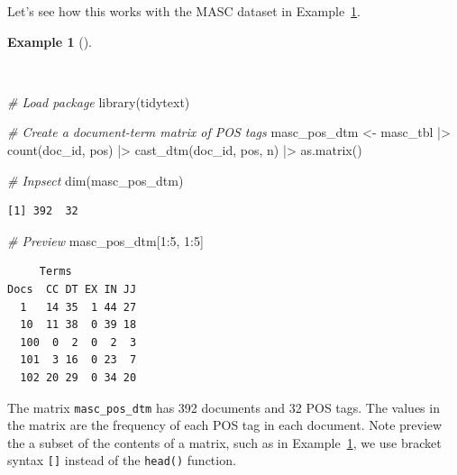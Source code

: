 \documentclass[
  letterpaper,
  krantz1]{latex/krantz-mod}
\newenvironment{Shaded}{\begin{snugshade}}{\end{snugshade}}
\newcommand{\CommentTok}[1]{\textcolor[rgb]{0.00,0.00,0.00}{\textit{#1}}}
\newcommand{\DecValTok}[1]{\textcolor[rgb]{0.00,0.00,0.00}{#1}}
\newcommand{\FunctionTok}[1]{\textcolor[rgb]{0.00,0.00,0.00}{#1}}
\newcommand{\NormalTok}[1]{\textcolor[rgb]{0.00,0.00,0.00}{#1}}
\newcommand{\OtherTok}[1]{\textcolor[rgb]{0.00,0.00,0.00}{#1}}
\newcommand{\SpecialCharTok}[1]{\textcolor[rgb]{0.00,0.00,0.00}{#1}}
\theoremstyle{definition}
\newtheorem{example}{Example}[chapter]
\theoremstyle{definition}
\theoremstyle{remark}
\begin{document}
Let's see how this works with the MASC dataset in
Example~\ref{exm-explore-masc-dtms}.

\begin{example}[]\protect\hypertarget{exm-explore-masc-dtms}{}\label{exm-explore-masc-dtms}

~

\begin{Shaded}
\begin{Highlighting}[numbers=left,,]
\CommentTok{\# Load package}
\FunctionTok{library}\NormalTok{(tidytext)}

\CommentTok{\# Create a document{-}term matrix of POS tags}
\NormalTok{masc\_pos\_dtm }\OtherTok{\textless{}{-}}
\NormalTok{  masc\_tbl }\SpecialCharTok{|\textgreater{}}
  \FunctionTok{count}\NormalTok{(doc\_id, pos) }\SpecialCharTok{|\textgreater{}}
  \FunctionTok{cast\_dtm}\NormalTok{(doc\_id, pos, n) }\SpecialCharTok{|\textgreater{}}
  \FunctionTok{as.matrix}\NormalTok{()}

\CommentTok{\# Inpsect}
\FunctionTok{dim}\NormalTok{(masc\_pos\_dtm)}
\end{Highlighting}
\end{Shaded}

\begin{verbatim}
[1] 392  32
\end{verbatim}

\begin{Shaded}
\begin{Highlighting}[numbers=left,,]
\CommentTok{\# Preview}
\NormalTok{masc\_pos\_dtm[}\DecValTok{1}\SpecialCharTok{:}\DecValTok{5}\NormalTok{, }\DecValTok{1}\SpecialCharTok{:}\DecValTok{5}\NormalTok{]}
\end{Highlighting}
\end{Shaded}

\begin{verbatim}
     Terms
Docs  CC DT EX IN JJ
  1   14 35  1 44 27
  10  11 38  0 39 18
  100  0  2  0  2  3
  101  3 16  0 23  7
  102 20 29  0 34 20
\end{verbatim}

\end{example}

The matrix \texttt{masc\_pos\_dtm} has 392 documents and 32 POS tags.
The values in the matrix are the frequency of each POS tag in each
document. Note preview the a subset of the contents of a matrix, such as
in Example~\ref{exm-explore-masc-dtms}, we use bracket syntax
\texttt{{[}{]}} instead of the \texttt{head()} function.
\end{document}
